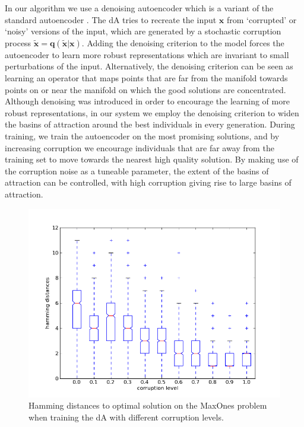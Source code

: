 \documentclass[twoside]{article}
\begin{document}
In our algorithm we use a denoising autoencoder which is a variant of the standard autoencoder \cite{vincent2008extracting}. The dA tries to recreate the input $\mathbf x$ from `corrupted' or `noisy' versions of the input, which are generated by a stochastic corruption process $\mathbf{\tilde x = q(\tilde x|x)}$. Adding the denoising criterion to the model forces the autoencoder to learn more robust representations which are invariant to small perturbations of the input. Alternatively, the denoising criterion can be seen as learning an operator that maps points that are far from the manifold towards points on or near the manifold on which the good solutions are concentrated. Although denoising was introduced in order to encourage the learning of more robust representations, in our system we employ the denoising criterion to widen the basins of attraction around the best individuals in every generation. During training, we train the autoencoder on the most promising solutions, and by increasing corruption we encourage individuals that are far away from the training set to move towards the nearest high quality solution. By making use of the corruption noise as a tuneable parameter, the extent of the basins of attraction can be controlled, with high corruption giving rise to large basins of attraction.
\begin{figure}[t!]
\centering
\includegraphics[scale=0.5]{boxplots_basins.png}
\caption{Hamming distances to optimal solution on the MaxOnes problem when training the dA with different corruption levels.}
\label{fig:corruption_hamming}
\end{figure}
\end{document}
